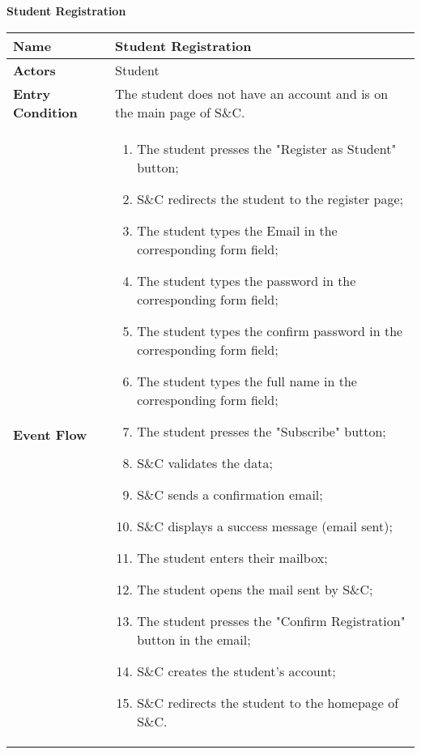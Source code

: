         \begin{enumerate}[label=\textbf{[US\arabic*]}, left = 0pt, align = left]
            \item \textbf{Student Registration}
            
            \begin{longtable}{|l|p{11cm}|}  
                \hline
                \textbf{Name} & 
                    \textbf{Student Registration} \\
                \hline
                
                \textbf{Actors} & 
                    Student \\
                \hline
                
                \textbf{Entry Condition} & 
                    The student does not have an account and is on the main page of S\&C. \\
                \hline
                
                \textbf{Event Flow} &
                    \begin{enumerate}[label=\arabic*., itemsep=0.2em]
                        \item The student presses the "Register as Student" button;
                        \item S\&C redirects the student to the register page;
                        \item The student types the Email in the corresponding form field;
                        \item The student types the password in the corresponding form field;
                        \item The student types the confirm password in the corresponding form field;
                        \item The student types the full name in the corresponding form field;
                        \item The student presses the "Subscribe" button;
                        \item S\&C validates the data;
                        \item S\&C sends a confirmation email;
                        \item S\&C displays a success message (email sent);
                        \item The student enters their mailbox;
                        \item The student opens the mail sent by S\&C;
                        \item The student presses the "Confirm Registration" button in the email;
                        \item S\&C creates the student's account;
                        \item S\&C redirects the student to the homepage of S\&C.
                    \end{enumerate} \\
                \hline
                

\end{longtable}
\end{enumerate}
